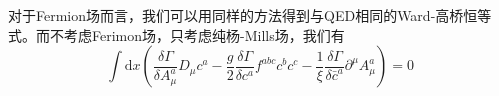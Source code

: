 对于Fermion场而言，我们可以用同样的方法得到与QED相同的Ward-高桥恒等式。而不考虑Ferimon场，只考虑纯杨-Mills场，我们有
\begin{equation}
    \int\mathrm{d}x \left( \frac{\delta \Gamma}{\delta A_\mu^a}D_\mu c^a -\frac{g}{2} \frac{\delta\Gamma}{\delta c^a}f^{abc}c^b c^c -\frac{1}{\xi}\frac{\delta\Gamma}{\delta \bar{c}^a}\partial^\mu A_\mu^a\right)=0\label{eq:zinn_justin}
\end{equation}
